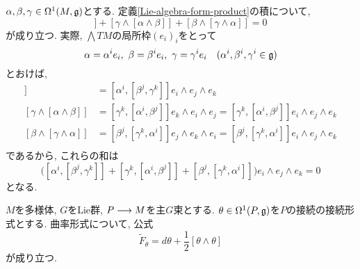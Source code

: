 \begin{rem}
  \label{Lie-algebra-form-product-Lie-identity}
  $\alpha, \beta, \gamma \in \Omega^1(M,\mathfrak{g})$とする.
  定義\ref{Lie-algebra-form-product}の積について,
  \begin{equation}
    [\alpha\wedge[\beta\wedge\gamma]]+
    [\gamma\wedge[\alpha\wedge\beta]]+
    [\beta\wedge[\gamma\wedge\alpha]]=0
  \end{equation}
  が成り立つ.
  実際, $\bigwedge TM$の局所枠$(e_i)_i$をとって
  \begin{equation}
  \alpha = \alpha^ie_i, \ \beta = \beta^ie_i, \ \gamma = \gamma^ie_i \quad
  (\alpha^i, \beta^i, \gamma^i \in \mathfrak{g})
  \end{equation}
  とおけば,
  \begin{align*}
    [\alpha\wedge[\beta\wedge\gamma]]&=
    [\alpha^i,[\beta^j,\gamma^k]]e_i\wedge e_j\wedge e_k \\
    [\gamma\wedge[\alpha\wedge\beta]]&=
    [\gamma^k,[\alpha^i,\beta^j]]e_k\wedge e_i\wedge e_j =
    [\gamma^k,[\alpha^i,\beta^j]]e_i\wedge e_j\wedge e_k \\
    [\beta\wedge[\gamma\wedge\alpha]]&=
    [\beta^j,[\gamma^k,\alpha^i]]e_j\wedge e_k\wedge e_i =
    [\beta^j,[\gamma^k,\alpha^i]]e_i\wedge e_j\wedge e_k \\
  \end{align*}
  であるから, これらの和は
  \begin{equation}
    \bigl(
    [\alpha^i,[\beta^j,\gamma^k]]+
    [\gamma^k,[\alpha^i,\beta^j]]+
    [\beta^j,[\gamma^k,\alpha^i]]
    \bigr)
    e_i\wedge e_j \wedge e_k = 0
  \end{equation}
  となる.
\end{rem}

\begin{thm}
\label{Cartan-structure-equation}
  $M$を多様体, $G$をLie群, $P \longrightarrow M$を主$G$束とする.
  $\theta \in \Omega^1(P, \mathfrak{g})$を$P$の接続の接続形式とする.
  曲率形式について, 公式
\begin{equation}
  \widetilde{F}_\theta = d\theta + \frac{1}{2}[\theta \wedge \theta]
\end{equation}
が成り立つ.
\end{thm}


